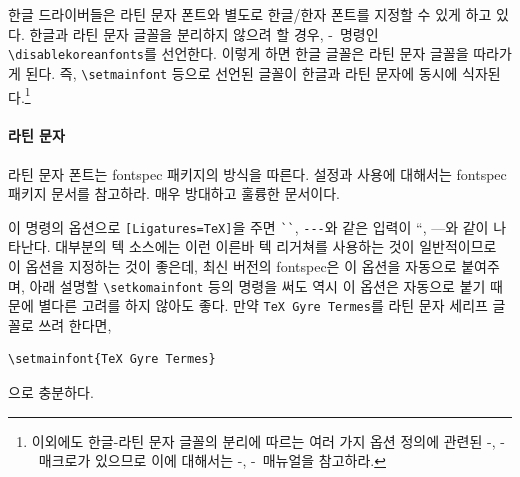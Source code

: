 \documentclass[
	12pt,
	a4paper,
	kosection,
	footnote,
	nobookmarks,
	microtype,
	figtabcapt,
]{oblivoir}
\def\cs#1{\texttt{\textbackslash #1}}
\def\ct#1{\texttt{#1}}
\def\xetexko{\XeTeX-\ko}
\def\luatexko{\LuaTeX-\ko}
\begin{document}
한글 드라이버들은 라틴 문자 폰트와 별도로 한글/한자 폰트를 지정할 수 있게 하고 있다.
한글과 라틴 문자 글꼴을 분리하지 않으려 할 경우, 
\xetexko\ 명령인
\verb|\disablekoreanfonts|를 선언한다.
이렇게 하면 한글 글꼴은
라틴 문자 글꼴을 따라가게 된다. 즉, \texttt{\textbackslash setmainfont}
등으로 선언된 글꼴이 한글과 라틴 문자에 동시에 식자된다.\footnote{%
 이외에도 한글-라틴 문자 글꼴의 분리에 따르는 여러 가지 옵션 정의에 관련된
 \xetexko, \luatexko\ 매크로가 있으므로 이에 대해서는 \xetexko, \luatexko\ 매뉴얼을
 참고하라.
}

\paragraph{라틴 문자}
라틴 문자 폰트는 fontspec 패키지의 방식을 따른다.
설정과 사용에 대해서는 fontspec 패키지 문서를 참고하라.
매우 방대하고 훌륭한 문서이다.

\begin{boxedverbatim}
\setmainfont{<Font Name>}
\setsansfont{...}
\setmonofont{...}
\end{boxedverbatim}

이 명령의 옵션으로 \verb|[Ligatures=TeX]|을 주면 \verb|``|, \verb|---|와 같은 
입력이 ``, ---와 같이 나타난다. 대부분의 텍 소스에는 이런 이른바 텍 리거쳐를 사용하는 것이
일반적이므로 이 옵션을 지정하는 것이 좋은데, 최신 버전의 fontspec은 이 옵션을 자동으로 붙여주며,
아래 설명할 \cs{setkomainfont} 등의 명령을 써도 역시 이 옵션은 자동으로 붙기 때문에 별다른 고려를 하지 않아도 좋다.
만약 \ct{TeX Gyre Termes}를 라틴 문자 세리프 글꼴로 쓰려 한다면,
\begin{verbatim}
\setmainfont{TeX Gyre Termes}
\end{verbatim}
으로 충분하다.
\end{document}
